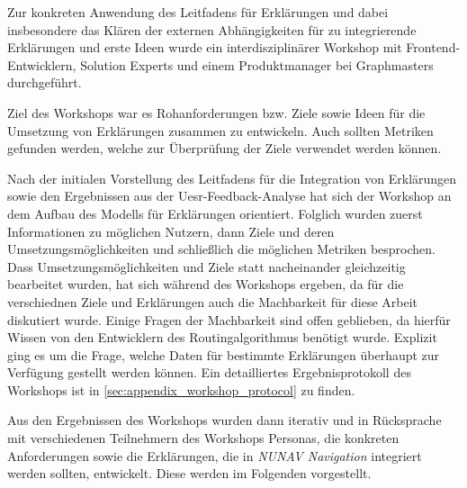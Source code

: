 Zur konkreten Anwendung des Leitfadens für Erklärungen und dabei insbesondere das Klären der externen Abhängigkeiten für zu integrierende Erklärungen und erste Ideen wurde ein interdisziplinärer Workshop mit Frontend-Entwicklern, \glqq Solution Experts\grqq{} und einem Produktmanager bei Graphmasters durchgeführt.

Ziel des Workshops war es Rohanforderungen bzw. Ziele sowie Ideen für die Umsetzung von Erklärungen zusammen zu entwickeln. Auch sollten Metriken gefunden werden, welche zur Überprüfung der Ziele verwendet werden können.

Nach der initialen Vorstellung des Leitfadens für die Integration von Erklärungen sowie den Ergebnissen aus der Uesr-Feedback-Analyse hat sich der Workshop an dem Aufbau des Modells für Erklärungen orientiert. Folglich wurden zuerst Informationen zu möglichen Nutzern, dann Ziele und deren Umsetzungsmöglichkeiten und schließlich die möglichen Metriken besprochen. Dass Umsetzungsmöglichkeiten und Ziele statt nacheinander gleichzeitig bearbeitet wurden, hat sich während des Workshops ergeben, da für die verschiednen Ziele und Erklärungen auch die Machbarkeit für diese Arbeit diskutiert wurde. Einige Fragen der Machbarkeit sind offen geblieben, da hierfür Wissen von den Entwicklern des Routingalgorithmus benötigt wurde. Explizit ging es um die Frage, welche Daten für bestimmte Erklärungen überhaupt zur Verfügung gestellt werden können. Ein detailliertes Ergebnisprotokoll des Workshops ist in \autoref{sec:appendix_workshop_protocol} zu finden.

Aus den Ergebnissen des Workshops wurden dann iterativ und in Rücksprache mit verschiedenen Teilnehmern des Workshops Personas, die konkreten Anforderungen sowie die Erklärungen, die in \textit{NUNAV Navigation} integriert werden sollten, entwickelt. Diese werden im Folgenden vorgestellt.